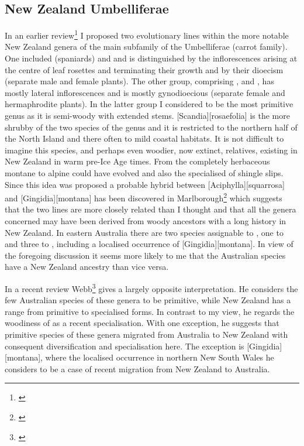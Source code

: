\subsection{New Zealand Umbelliferae}

In an earlier review\footnote{\cite{dawson1971relationships}} I proposed two evolutionary lines within the more notable New Zealand genera of the main subfamily of the Umbelliferae (carrot family).
One included  (spaniards) and  and is distinguished by the inflorescences arising at the centre of leaf rosettes and terminating their growth and by their dioecism (separate male and female plants).
The other group, comprising ,  and , has mostly lateral inflorescences and is mostly gynodioecious (separate female and hermaphrodite plants).
In the latter group I considered  to be the most primitive genus as it is semi-woody with extended stems. [Scandia][rosaefolia] is the more shrubby of the two species of the genus and it is restricted to the northern half of the North Island and there often to mild coastal habitats.
It is not difficult to imagine this species, and perhaps even woodier, now extinct, relatives, existing in New Zealand in warm pre-Ice Age times.
From  the completely herbaceous montane to alpine  could have evolved and also the specialised  of shingle slips.
Since this idea was proposed a probable hybrid between [Aciphylla][squarrosa] and [Gingidia][montana] has been discovered in Marlborough\footnote{\cite{webb1984natural}} which suggests that the two lines are more closely related than I thought and that all the genera concerned may have been derived from woody ancestors with a long history in New Zealand.
In eastern Australia there are two species assignable to , one to  and three to , including a localised occurrence of [Gingidia][montana].
In view of the foregoing discussion it seems more likely to me that the Australian species have a New Zealand ancestry than vice versa.

In a recent review Webb\footnote{\cite{webb1986breeding}} gives a largely opposite interpretation.
He considers the few Australian species of these genera to be primitive, while New Zealand has a range from primitive to specialised forms.
In contrast to my view, he regards the woodiness of  as a recent specialisation.
With one exception, he suggests that primitive species of these genera migrated from Australia to New Zealand with consequent diversification and specialisation here.
The exception is [Gingidia][montana], where the localised occurrence in northern New South Wales he considers to be a case of recent migration from New Zealand to Australia.

